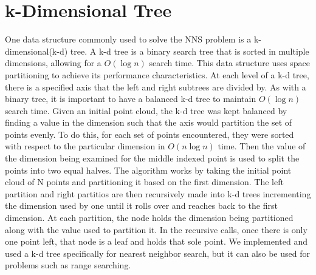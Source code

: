 \documentclass[a4paper,12pt,twocolumn]{article}
\begin{document}
\section{k-Dimensional Tree}
\break
One data structure commonly used to solve the NNS problem is a k-dimensional(k-d) tree.
A k-d tree is a binary search tree that is sorted in multiple dimensions, allowing
for a $O(\log n)$ search time.
This data structure uses space partitioning to achieve its performance characteristics.
At each level of a k-d tree, there is a specified axis that the left and right subtrees
are divided by.
As with a binary tree, it is important to have a balanced k-d tree to maintain $O(\log n)$
search time. Given an initial point cloud, the k-d tree was kept balanced by finding a
value in the dimension such that the axis would partition the set of points evenly. To do
this, for each set of points encountered, they were sorted with respect to the particular
dimension in $O(n \log n)$ time. Then the value of the dimension being examined for the
middle indexed point is used to split the points into two equal halves.
The algorithm works by taking the initial point cloud of N points and partitioning it
based on the first dimension. The left partition and right partitios are then recursively
made into k-d trees incrementing the dimension used by one until it rolls over and reaches
back to the first dimension. At each partition, the node holds the dimension being partitioned
along with the value used to partition it. In the recursive calls, once there is only one point
left, that node is a leaf and holds that sole point.
We implemented and used a k-d tree specifically for nearest neighbor search, but it can
also be used for problems such as range searching.
\end{document}
